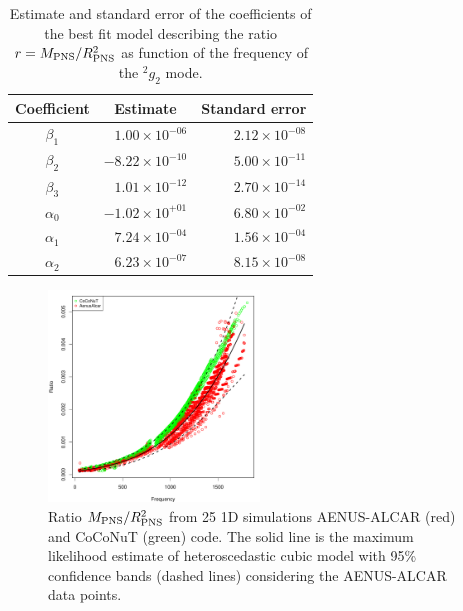 
\begin{table}[h]

  \begin{tabular}{crr}
    \hline
    Coefficient & \multicolumn{1}{c}{Estimate} & Standard error \\
    \hline
   $\beta_1$  &  $ 1.00 \times 10^{-06}$ & $2.12 \times 10^{-08}$ \\   
   $\beta_2$  &  $-8.22 \times 10^{-10}$ & $5.00 \times 10^{-11}$ \\
   $\beta_3$  &  $ 1.01 \times 10^{-12}$ & $2.70 \times 10^{-14}$ \\
   $\alpha_0$ &  $-1.02 \times 10^{+01}$ & $6.80 \times 10^{-02}$ \\
   $\alpha_1$ &  $ 7.24 \times 10^{-04}$ & $1.56 \times 10^{-04}$ \\
   $\alpha_2$ &  $ 6.23 \times 10^{-07}$ & $8.15 \times 10^{-08}$ \\   
    \hline
  \end{tabular}
\caption{Estimate and standard error of the coefficients of the best fit model describing the ratio $r=M_{\rm PNS}/R_{\rm PNS}^2$ as function of the frequency of the $\mbox{}^2g_2$ mode.}\label{tab:model}
\end{table}

\begin{figure}
 \centering
 \includegraphics[width=0.5\textwidth]{plots/model}
 \caption{Ratio $M_{\rm PNS}/R_{\rm PNS}^2$ from 25 1D simulations {\sc AENUS-ALCAR} (red) and {\sc CoCoNuT} (green) code. The solid line is the maximum likelihood estimate of heteroscedastic cubic model with 95\% confidence bands (dashed lines) considering the {\sc AENUS-ALCAR} data points.} \label{fig:LMVAR}
\end{figure}

